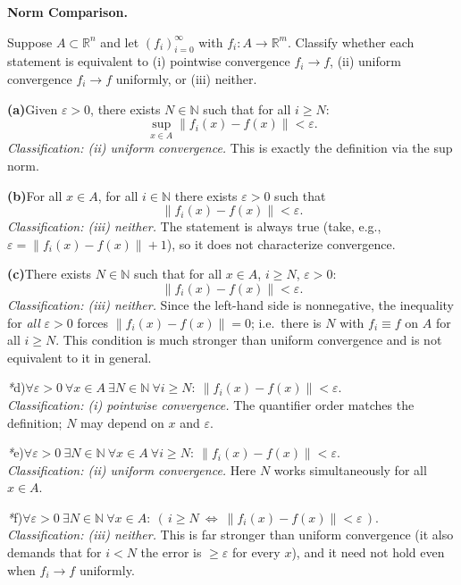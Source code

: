 \begin{problem}[CP-II-0241]
\label{prob:cp-ii-0241}
\textbf{Norm Comparison.}

\hspace*{1.5em}Suppose $A\subset\mathbb{R}^n$ and let $(f_i)_{i=0}^\infty$ with $f_i:A\to\mathbb{R}^m$.
Classify whether each statement is equivalent to (i) pointwise convergence $f_i\to f$,
(ii) uniform convergence $f_i\to f$ uniformly, or (iii) neither.

\renewcommand\labelenumi{(\alph{enumi})}

\par\smallskip\noindent\textbf{(a)}\quad Given $\varepsilon>0$, there exists $N\in\mathbb{N}$ such that for all $i\ge N$:
\[
\sup_{x\in A}\|f_i(x)-f(x)\|<\varepsilon.
\]
\textit{Classification: (ii) uniform convergence.} This is exactly the definition via the sup norm.

\par\smallskip\noindent\textbf{(b)}\quad For all $x\in A$, for all $i\in\mathbb{N}$ there exists $\varepsilon>0$ such that
\[
\|f_i(x)-f(x)\|<\varepsilon.
\]
\textit{Classification: (iii) neither.} The statement is always true (take, e.g., $\varepsilon=\|f_i(x)-f(x)\|+1$), so it does not characterize convergence.

\par\smallskip\noindent\textbf{(c)}\quad There exists $N\in\mathbb{N}$ such that for all $x\in A$, $i\ge N$, $\varepsilon>0$:
\[
\|f_i(x)-f(x)\|<\varepsilon.
\]
\textit{Classification: (iii) neither.} Since the left-hand side is nonnegative, the inequality for \emph{all} $\varepsilon>0$ forces $\|f_i(x)-f(x)\|=0$; i.e.\ there is $N$ with $f_i\equiv f$ on $A$ for all $i\ge N$. This condition is much stronger than uniform convergence and is not equivalent to it in general.

\par\noindent \textit{*}d)\quad $\forall\varepsilon>0\ \forall x\in A\ \exists N\in\mathbb{N}\ \forall i\ge N:\ \|f_i(x)-f(x)\|<\varepsilon$.\\
\textit{Classification: (i) pointwise convergence.} The quantifier order matches the definition; $N$ may depend on $x$ and $\varepsilon$.

\par\noindent \textit{*}e)\quad $\forall\varepsilon>0\ \exists N\in\mathbb{N}\ \forall x\in A\ \forall i\ge N:\ \|f_i(x)-f(x)\|<\varepsilon$.\\
\textit{Classification: (ii) uniform convergence.} Here $N$ works simultaneously for all $x\in A$.

\par\noindent \textit{*}f)\quad $\forall\varepsilon>0\ \exists N\in\mathbb{N}\ \forall x\in A:\ (\,i\ge N\ \Leftrightarrow\ \|f_i(x)-f(x)\|<\varepsilon\,)$.\\
\textit{Classification: (iii) neither.} This is far stronger than uniform convergence (it also demands that for $i<N$ the error is $\ge\varepsilon$ for every $x$), and it need not hold even when $f_i\to f$ uniformly.
\end{problem}

